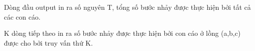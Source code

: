 Dòng đầu output in ra số nguyên T, tổng số bước nhảy được thực hiện bởi tất cả các con cáo.

K dòng tiếp theo in ra số bước nhảy được thực hiện bởi con cáo ở lồng (a,b,c) được cho bởi truy vấn thứ K.

\